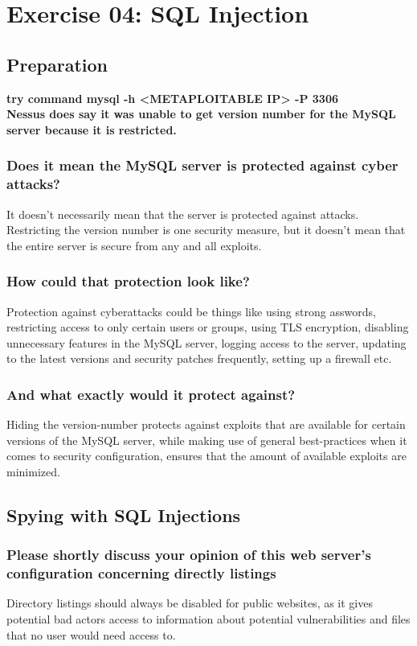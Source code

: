 \section*{Exercise 04: SQL Injection}

\subsection*{Preparation}
\textbf{try command mysql -h <METAPLOITABLE IP> -P 3306}\\
\textbf{Nessus does say it was unable to get version number for the MySQL server because it is restricted.}
\subsubsection*{Does it mean the MySQL server is protected against cyber attacks?}
It doesn't necessarily mean that the server is protected against attacks. Restricting the version number is one security measure, but it doesn't mean that the entire server is secure from any and all exploits.

\subsubsection*{How could that protection look like?}
Protection against cyberattacks could be things like using strong asswords, restricting access to only certain users or groups, using TLS encryption, disabling unnecessary features in the MySQL server, logging access to the server, updating to the latest versions and security patches frequently, setting up a firewall etc.
\subsubsection*{And what exactly would it protect against?}
Hiding the version-number protects against exploits that are available for certain versions of the MySQL server, while making use of general best-practices when it comes to security configuration, ensures that the amount of available exploits are minimized.

\subsection*{Spying with SQL Injections}
\subsubsection*{Please shortly discuss your opinion of this web server's configuration concerning directly listings}
Directory listings should always be disabled for public websites, as it gives potential bad actors access to information about potential vulnerabilities and files that no user would need access to.

